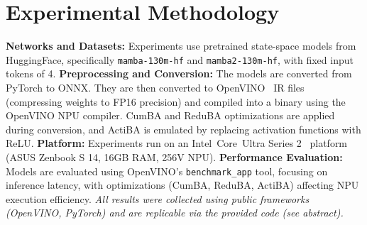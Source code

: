 \section{Experimental Methodology}\label{sec_expt_meth}
\textbf{Networks and Datasets:}  
Experiments use pretrained state-space models from HuggingFace, specifically \texttt{mamba-130m-hf} and \texttt{mamba2-130m-hf}, with fixed input tokens of 4.
\textbf{Preprocessing and Conversion:}  
The models are converted from PyTorch to ONNX. They are then converted to OpenVINO~\cite{openvino} IR files (compressing weights to FP16 precision) and compiled into a binary using the OpenVINO NPU compiler. CumBA and ReduBA optimizations are applied during conversion, and ActiBA is emulated by replacing activation functions with ReLU.
\textbf{Platform:}  
Experiments run on an Intel\textregistered\ Core\texttrademark\ Ultra Series 2~\cite{lnl} platform (ASUS Zenbook S 14, 16GB RAM, 256V NPU).
\textbf{Performance Evaluation:}  
Models are evaluated using OpenVINO’s \texttt{benchmark\_app} tool, focusing on inference latency, with optimizations (CumBA, ReduBA, ActiBA) affecting NPU execution efficiency.
\textit{All results were collected using public frameworks (OpenVINO, PyTorch) and are replicable via the provided code (see abstract).}



